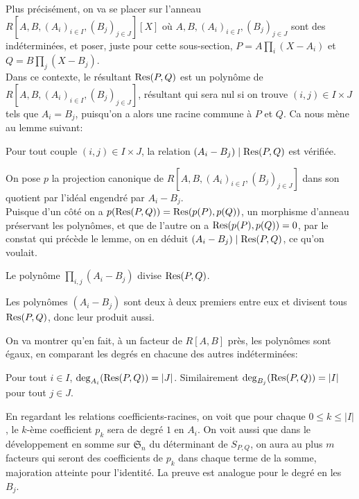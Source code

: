 \documentclass{article}
\begin{document}
Plus précisément, on va se placer sur l'anneau $R[A, B, (A_i)_{i \in I}, (B_j)_{j \in J}][X]$ où $A, B, (A_i)_{i \in I}, (B_j)_{j \in J}$ sont des indéterminées, et poser, juste pour cette sous-section, $P = A\prod_{i}{(X-A_i)}$ et $Q = B\prod_{j}{(X-B_j)}$.\\


Dans ce contexte, le résultant $\textrm{Res}(P, Q)$ est un polynôme de $R[A, B, (A_i)_{i \in I}, (B_j)_{j \in J}]$, résultant qui sera nul si on trouve $(i, j) \in I \times J$ tels que $A_i = B_j$, puisqu'on a alors une racine commune à $P$ et $Q$. Ca nous mène au lemme suivant:

\begin{lemme}
Pour tout couple $(i, j) \in I \times J$, la relation $(A_i - B_j) \mid \textrm{Res}(P, Q)$ est vérifiée.
\end{lemme}

\begin{preuve}
On pose $p$ la projection canonique de $R[A, B, (A_i)_{i \in I}, (B_j)_{j \in J}]$ dans son quotient par l'idéal engendré par $A_i - B_j$.\\
Puisque d'un côté on a $p(\textrm{Res}(P, Q)) = \textrm{Res}(p(P), p(Q))$, un morphisme d'anneau préservant les polynômes, et que de l'autre on a $\textrm{Res}(p(P), p(Q)) = 0$, par le constat qui précède le lemme, on en déduit $(A_i - B_j) \mid \textrm{Res}(P, Q)$, ce qu'on voulait.
\end{preuve}

\begin{proposition}
Le polynôme $\prod_{i, j}{(A_i-B_j)}$ divise $\textrm{Res}(P, Q)$.
\end{proposition}

\begin{preuve}
Les polynômes $(A_i - B_j)$ sont deux à deux premiers entre eux et divisent tous $\textrm{Res}(P, Q)$, donc leur produit aussi.\\
\end{preuve}

On va montrer qu'en fait, à un facteur de $R[A, B]$ près, les polynômes sont égaux, en comparant les degrés en chacune des autres indéterminées:

\begin{lemme}
Pour tout $i \in I$, $\deg_{A_i}(\textrm{Res}(P, Q)) = |J|$. Similairement $\deg_{B_j}(\textrm{Res}(P, Q)) = |I|$ pour tout $j \in J$.
\end{lemme}

\begin{preuve}
En regardant les relations coefficients-racines, on voit que pour chaque $0 \leq k \leq |I|$, le $k$-ème coefficient $p_k$ sera de degré $1$ en $A_i$. On voit aussi que dans le développement en somme sur $\mathfrak{S}_n$ du déterminant de $S_{P, Q}$, on aura au plus $m$ facteurs qui seront des coefficients de $p_k$ dans chaque terme de la somme, majoration atteinte pour l'identité. La preuve est analogue pour le degré en les $B_j$.\\
\end{preuve}
\end{document}
